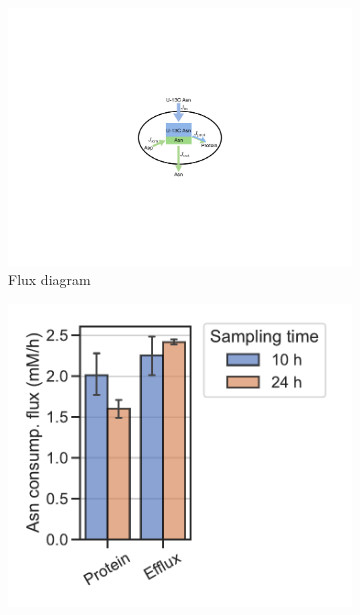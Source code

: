 \begin{figure}[ht]
     \centering
     \hspace{0.1\textwidth}
     \begin{subfigure}[b]{0.35\textwidth}
         \centering
         \includegraphics[width=\textwidth]{figures/chap2/asn_Jprot.pdf}
         \caption{Flux diagram}
         \label{fig:ch2:asn_Jprot}
     \end{subfigure}
     \hfill
     \begin{subfigure}[b]{0.4\textwidth}
         \centering
         \includegraphics[width=\textwidth]{figures/chap2/Asn_flux.pdf}

\end{subfigure}
\end{figure}
